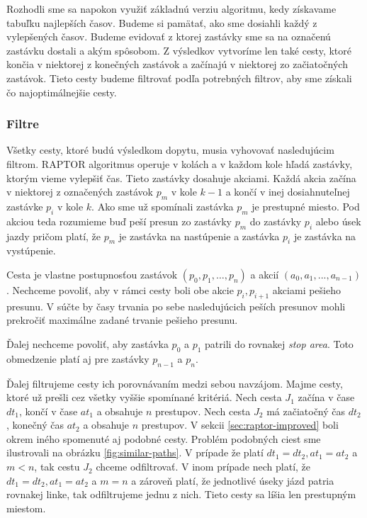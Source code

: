 Rozhodli sme sa napokon využiť základnú verziu algoritmu, kedy získavame tabuľku najlepších časov. Budeme si pamätať, ako sme dosiahli každý z vylepšených časov. Budeme evidovať z ktorej zastávky sme sa na označenú zastávku dostali a akým spôsobom. Z výsledkov vytvoríme len také cesty, ktoré končia v niektorej z konečných zastávok a začínajú v niektorej zo začiatočných zastávok. Tieto cesty budeme filtrovať podľa potrebných filtrov, aby sme získali čo najoptimálnejšie cesty. 

\subsubsection{Filtre}
Všetky cesty, ktoré budú výsledkom dopytu, musia vyhovovať nasledujúcim filtrom. RAPTOR algoritmus operuje v kolách a v každom kole hľadá zastávky, ktorým vieme vylepšiť čas. Tieto zastávky dosahuje akciami. Každá akcia začína v niektorej z označených zastávok $p_m$ v kole $k-1$ a končí v inej dosiahnuteľnej zastávke $p_i$ v kole $k$.  Ako sme už spomínali zastávka $p_m$ je prestupné miesto. Pod akciou teda rozumieme buď peší presun zo zastávky $p_m$ do zastávky $p_i$ alebo úsek jazdy pričom platí, že $p_m$ je zastávka na nastúpenie a zastávka $p_i$ je zastávka na vystúpenie.

Cesta je vlastne postupnosťou zastávok $(p_0, p_1, …, p_n)$ a akcií $(a_0, a_1, ..., a_{n-1})$. Nechceme povoliť, aby v rámci cesty boli obe akcie $p_i, p_{i+1}$ akciami pešieho presunu. V súčte by časy trvania po sebe nasledujúcich peších presunov mohli prekročiť maximálne zadané trvanie pešieho presunu. 

Ďalej nechceme povoliť, aby zastávka $p_0$ a $p_1$ patrili do rovnakej \textit{stop area}. Toto obmedzenie platí aj pre zastávky $p_{n-1}$ a $p_n$.

Ďalej filtrujeme cesty ich porovnávaním medzi sebou navzájom. Majme cesty, ktoré už prešli cez všetky vyššie spomínané kritériá. Nech cesta $J_1$ začína v čase $dt_1$, končí v čase $at_1$ a obsahuje $n$ prestupov. Nech cesta $J_2$ má začiatočný čas $dt_2$, konečný čas $at_2$ a obsahuje $n$ prestupov. V sekcii \ref{sec:raptor-improved} boli okrem iného spomenuté aj podobné cesty. Problém podobných ciest sme ilustrovali na obrázku \ref{fig:similar-paths}. V prípade že platí $dt_1 = dt_2, at_1=at_2$ a $m < n$, tak cestu $J_2$ chceme odfiltrovať. V inom prípade nech platí, že $dt_1 = dt_2, at_1=at_2$ a $m=n$ a zároveň platí, že jednotlivé úseky jázd patria rovnakej linke, tak odfiltrujeme jednu z nich. Tieto cesty sa líšia len prestupným miestom. 

